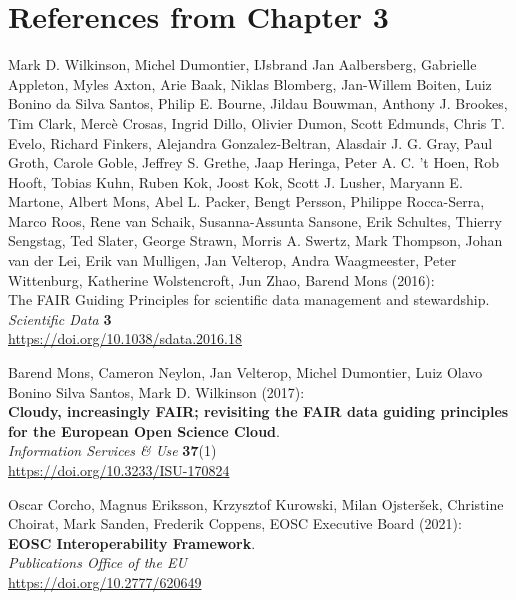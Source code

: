
\section{References from Chapter 3}

\begin{thebibliography}{9}
   
Mark D. Wilkinson, Michel Dumontier, IJsbrand Jan Aalbersberg, Gabrielle
Appleton, Myles Axton, Arie Baak, Niklas Blomberg, Jan-Willem Boiten,
Luiz Bonino da Silva Santos, Philip E. Bourne, Jildau Bouwman, Anthony
J. Brookes, Tim Clark, Mercè Crosas, Ingrid Dillo, Olivier Dumon, Scott
Edmunds, Chris T. Evelo, Richard Finkers, Alejandra Gonzalez-Beltran,
Alasdair J. G. Gray, Paul Groth, Carole Goble, Jeffrey S. Grethe, Jaap
Heringa, Peter A. C. 't Hoen, Rob Hooft, Tobias Kuhn, Ruben Kok, Joost
Kok, Scott J. Lusher, Maryann E. Martone, Albert Mons, Abel L. Packer,
Bengt Persson, Philippe Rocca-Serra, Marco Roos, Rene van Schaik,
Susanna-Assunta Sansone, Erik Schultes, Thierry Sengstag, Ted Slater,
George Strawn, Morris A. Swertz, Mark Thompson, Johan van der Lei, Erik
van Mulligen, Jan Velterop, Andra Waagmeester, Peter Wittenburg,
Katherine Wolstencroft, Jun Zhao, Barend Mons (2016):\\
The {FAIR
Guiding Principles} for scientific data management and stewardship.
\emph{Scientific Data} \textbf{3} \\
\url{https://doi.org/10.1038/sdata.2016.18}

Barend Mons, Cameron Neylon, Jan Velterop, Michel Dumontier, Luiz Olavo
Bonino Silva Santos, Mark D. Wilkinson (2017): \\
\textbf{Cloudy, increasingly {FAIR}; revisiting the {FAIR} data guiding principles for the European
Open Science Cloud}.\\
\emph{Information Services \& Use} \textbf{37}(1)\\
\url{https://doi.org/10.3233/ISU-170824}

Oscar Corcho, Magnus Eriksson, Krzysztof Kurowski, Milan Ojsteršek,
Christine Choirat, Mark Sanden, Frederik Coppens, EOSC Executive
Board (2021): \\
\textbf{EOSC Interoperability Framework}.\\
\emph{Publications Office of the EU} \\
\url{https://doi.org/10.2777/620649}


\end{thebibliography}
